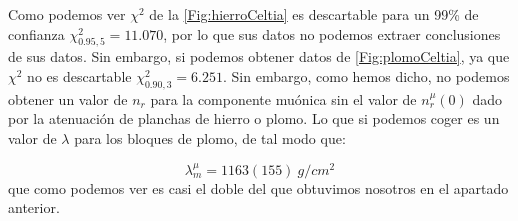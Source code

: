 \documentclass[11pt]{article}
\begin{document}
Como podemos ver $\chi^2$ de la \cref{Fig:hierroCeltia} es descartable para un 99\% de confianza $\chi^2_{0.95,5}=11.070$, por lo que sus datos no podemos extraer conclusiones de sus datos. Sin embargo, si podemos obtener datos de \cref{Fig:plomoCeltia}, ya que $\chi^2$ no es descartable $\chi^2_{0.90,3}=6.251$. Sin embargo, como hemos dicho, no podemos obtener un valor de $n_r$ para la componente muónica sin el valor de $n_r^\mu(0)$ dado por la atenuación de planchas de hierro o plomo. Lo que si podemos coger es un valor de $\lambda$ para los bloques de plomo, de tal modo que: 

\begin{equation}
	\lambda^\mu_m= 1163(155) \ \unit{g/cm^2}
\end{equation}
que como podemos ver es casi el doble del que obtuvimos nosotros en el apartado anterior. 



\end{document}
